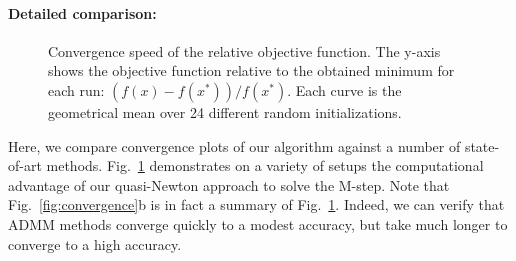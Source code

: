 \paragraph{Detailed comparison:}

\begin{figure}[htb]
    \centering
    \caption[Convergence speed of the relative objective function.]{Convergence speed of the relative objective function. The y-axis shows the objective function relative to the obtained minimum for each run: $(f(x) - f(x^*))/f(x^*)$. Each curve is the geometrical mean over 24 different random initializations.}
    \label{fig:convergence_setups}
\end{figure}

Here, we compare convergence plots of our algorithm against a number of state-of-art methods. Fig.~\ref{fig:convergence_setups} demonstrates on a variety of setups the computational
advantage of our quasi-Newton approach to solve the M-step.
Note that Fig.~\ref{fig:convergence}b is in fact a summary of Fig.~\ref{fig:convergence_setups}. 
Indeed, we can verify that ADMM methods converge quickly to a modest accuracy, but take much longer to converge to a high accuracy.\citep{boyd2011distributed}

